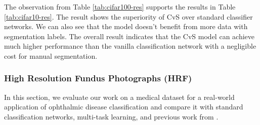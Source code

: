 \documentclass[conference]{IEEEtran}
\begin{document}
The observation from Table \ref{tab:cifar100-res} supports the results in Table \ref{tab:cifar10-res}. The result shows the superiority of CvS over standard classifier networks. We can also see that the model doesn't benefit from more data with segmentation labels. The overall result indicates that the CvS model can achieve much higher performance than the vanilla classification network with a negligible cost for manual segmentation.  

\subsubsection{High Resolution Fundus Photographs (HRF)}
In this section, we evaluate our work on a medical dataset for a real-world application of ophthalmic disease classification and compare it with standard classification networks, multi-task learning, and previous work from \cite{diaz2019cnns}. 
\end{document}
